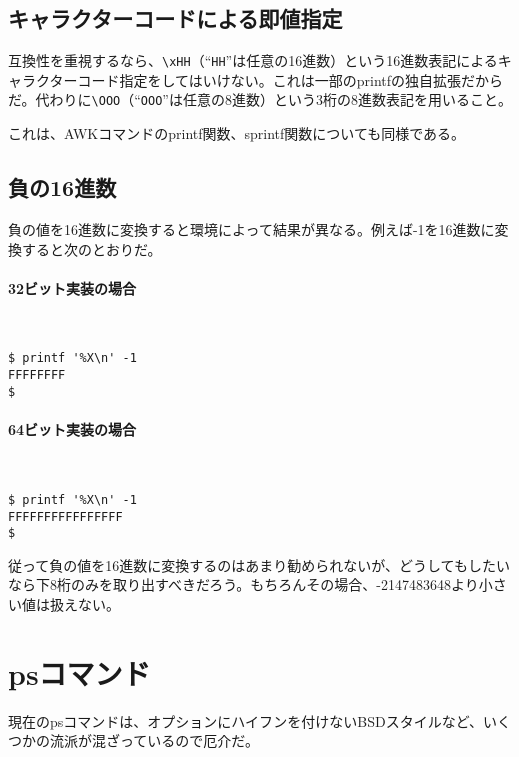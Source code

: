 \subsection*{キャラクターコードによる即値指定}

互換性を重視するなら、\verb|\xHH|（``\verb|HH|''は任意の16進数）という16進数表記によるキャラクターコード指定をしてはいけない。これは一部のprintfの独自拡張だからだ。代わりに\verb|\OOO|（``\verb|OOO|''は任意の8進数）という3桁の8進数表記を用いること。

これは、AWKコマンドのprintf関数、sprintf関数についても同様である。

\subsection*{負の16進数}

負の値を16進数に変換すると環境によって結果が異なる。例えば-1を16進数に変換すると次のとおりだ。

\paragraph{32ビット実装の場合} 　\\
\begin{screen}
	\verb!$ printf '%X\n' -1! \return \\
	\verb|FFFFFFFF|                   \\
	\verb|$ |
\end{screen}

\paragraph{64ビット実装の場合} 　\\
\begin{screen}
	\verb!$ printf '%X\n' -1! \return \\
	\verb|FFFFFFFFFFFFFFFF|           \\
	\verb|$ |
\end{screen}

従って負の値を16進数に変換するのはあまり勧められないが、どうしてもしたいなら下8桁のみを取り出すべきだろう。もちろんその場合、-2147483648より小さい値は扱えない。

\section{psコマンド}

現在のpsコマンドは、オプションにハイフンを付けないBSDスタイルなど、いくつかの流派が混ざっているので厄介だ。

